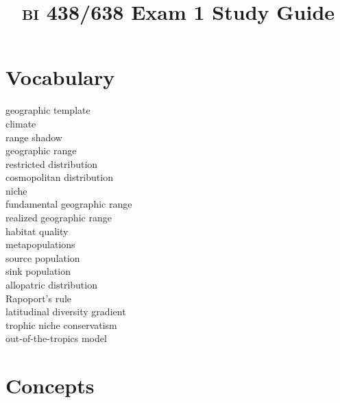 \documentclass[letterpaper]{tufte-handout}
\title{{\scshape bi} 438/638 Exam 1 Study Guide}
\date{} %
\begin{document}
\maketitle	%

\section*{Vocabulary}

\vspace{-1\baselineskip}
\begin{multicols}{2}
geographic template \\
climate \\
range shadow \\
geographic range  \\
restricted distribution \\
cosmopolitan distribution \\
niche \\
fundamental geographic range \\
realized geographic range \\
habitat quality \\
metapopulations \\
source population \\
sink population \\
allopatric distribution \\
Rapoport's rule \\
latitudinal diversity gradient \\
trophic niche conservatism \\
out-of-the-tropics model \\
\end{multicols}

\section*{Concepts}
\end{document}

